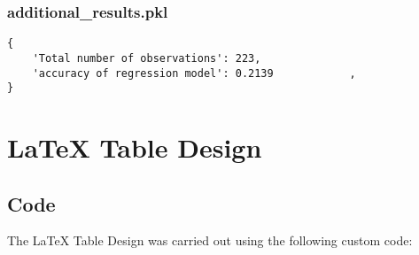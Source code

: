 \documentclass[11pt]{article}
\begin{document}
\subsubsection*{additional\_results.pkl}

\begin{Verbatim}[tabsize=4]
{
    'Total number of observations': 223,
    'accuracy of regression model': 0.2139            ,
}
\end{Verbatim}

\section{LaTeX Table Design} \subsection{Code}The LaTeX Table Design was carried out using the following custom code:
\end{document}
